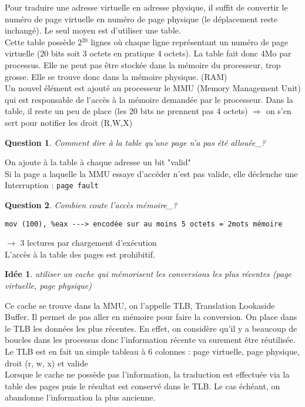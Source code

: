 \documentclass[12pt,a4paper]{report}
\newtheorem*{q}{Question}
\newtheorem*{id}{Idée}
\begin{document}
Pour traduire une adresse virtuelle en adresse physique, il suffit de convertir le numéro de page virtuelle en numéro de page physique (le déplacement reste inchangé).
Le seul moyen est d'utiliser une table.\\
Cette table possède 2$^{20}$ lignes où chaque ligne représentant un numéro de page virtuelle (20 bits soit 3 octets en pratique 4 octets). La table fait donc 4Mo par processus. Elle ne peut pas être stockée dans la mémoire du processeur, trop grosse. Elle se trouve donc dans la mémoire physique. (RAM)\\

Un nouvel élément est ajouté au processeur le MMU (Memory Management Unit) qui est responsable de l'accès à la mémoire demandée par le processeur.
Dans la table, il reste un peu de place (les 20 bits ne prennent pas 4 octets) $\Rightarrow$ on s'en sert pour notifier les droit (R,W,X)\\

\begin{q}Comment dire à la table qu'une page n'a pas été allouée_?\end{q}
On  ajoute à la table à chaque adresse un bit "valid"\\
Si la page a laquelle la MMU essaye d’accéder n'est pas valide, elle déclenche une Interruption : \verb?page fault?\\

\begin{q}Combien  coute l'accès mémoire_?\end{q}
\begin{verbatim}
mov (100), %eax ---> encodée sur au moins 5 octets = 2mots mémoire
\end{verbatim}
$\longrightarrow$ 3 lectures par chargement d’exécution \\
L'accès à la table des pages est prohibitif.\\
\begin{id} utiliser un cache qui mémorisent les conversions les plus récentes (page virtuelle, page physique)\end{id}
Ce cache se trouve dans la MMU, on l'appelle TLB, Translation Lookaside Buffer. Il permet de pas aller en mémoire pour faire la conversion. On place dans le TLB les données les plus récentes. En effet, on considère qu'il y a beaucoup de boucles dans les processus donc l'information récente va surement être réutilisée.\\
Le TLB est en fait un simple tableau à 6 colonnes : page virtuelle, page physique, droit (r, w, x) et valide\\
Lorsque le cache ne possède pas l'information, la traduction est effectuée via la table des pages puis le résultat est conservé dans le TLB. Le cas échéant, on abandonne l'information la plus ancienne.
\end{document}
